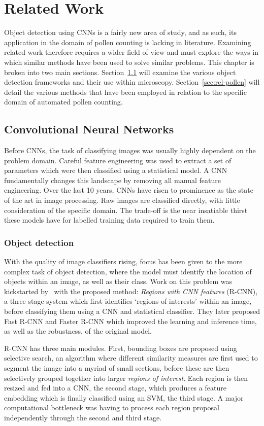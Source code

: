 \chapter{Related Work}\label{cha:related}
Object detection using CNNs is a fairly new area of study, and as such, its application in the domain of pollen counting is lacking in literature.
Examining related work therefore requires a wider field of view and must explore the ways in which similar methods have been used to solve similar problems.
This chapter is broken into two main sections.
Section~\ref{sec:rel-cnn} will examine the various object detection frameworks and their use within microscopy.
Section~\ref{sec:rel-pollen} will detail the various methods that have been employed in relation to the specific domain of automated pollen counting.

\section{Convolutional Neural Networks}\label{sec:rel-cnn}
Before CNNs, the task of classifying images was usually highly dependent on the problem domain.
Careful feature engineering was used to extract a set of parameters which were then classified using a statistical model.
A CNN fundamentally changes this landscape by removing all manual feature engineering.
Over the last 10 years, CNNs have risen to prominence as the state of the art in image processing.
Raw images are classified directly, with little consideration of the specific domain.
The trade-off is the near insatiable thirst these models have for labelled training data required to train them.

\subsection{Object detection}
With the quality of image classifiers rising, focus has been given to the more complex task of object detection, where the model must identify the location of objects within an image, as well as their class.
Work on this problem was kickstarted by\ \textcite{girshick_rich_2014} with the proposed method: \textit{Regions with CNN features} (R-CNN), a three stage system which first identifies `regions of interests' within an image, before classifying them using a CNN and statistical classifier.
They later proposed Fast R-CNN and Faster R-CNN which improved the learning and inference time, as well as the robustness, of the original model.

R-CNN has three main modules.
First, bounding boxes are proposed using selective search, an algorithm where different similarity measures are first used to segment the image into a myriad of small sections, before these are then selectively grouped together into larger \textit{regions of interest}.
Each region is then resized and fed into a CNN, the second stage, which produces a feature embedding which is finally classified using an SVM, the third stage.
A major computational bottleneck was having to process each region proposal independently through the second and third stage.

